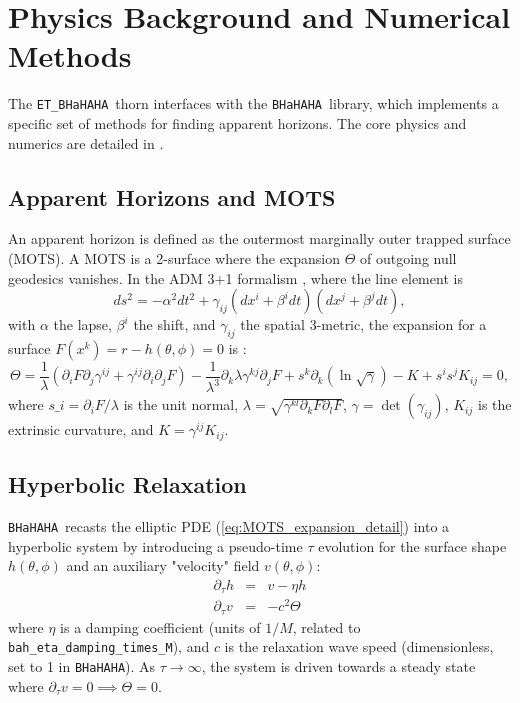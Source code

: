 \documentclass[a4paper,11pt]{article}
\newcommand{\thorn}[1]{{\tt #1}}
\newcommand{\BHaHAHA}{\thorn{ET\_BHaHAHA}} %
\newcommand{\bhahlib}{\texttt{BHaHAHA}} %
\begin{document}
\section{Physics Background and Numerical Methods}
\label{sec:physics_numerics}
The \BHaHAHA\ thorn interfaces with the \bhahlib\ library, which implements a specific set of methods for finding apparent horizons. The core physics and numerics are detailed in \cite{Etienne2025etal}.

\subsection{Apparent Horizons and MOTS}
An apparent horizon is defined as the outermost marginally outer trapped surface (MOTS). A MOTS is a 2-surface where the expansion $\Theta$ of outgoing null geodesics vanishes. In the ADM 3+1 formalism \cite{ADM62}, where the line element is
\begin{equation}
ds^2 = -\alpha^2 dt^2 + \gamma_{ij} (dx^i + \beta^i dt) (dx^j + \beta^j dt),
\label{eq:adm_line_element}
\end{equation}
with $\alpha$ the lapse, $\beta^i$ the shift, and $\gamma_{ij}$ the spatial 3-metric, the expansion for a surface $F(x^k)=r-h(\theta,\phi)=0$ is \cite{Etienne2025etal}:
\begin{equation}
\Theta = \frac{1}{\lambda} (\partial_i F \partial_j \gamma^{ij} + \gamma^{ij} \partial_i \partial_j F) - \frac{1}{\lambda^3} \partial_k \lambda \gamma^{kj} \partial_j F + s^k \partial_k (\ln \sqrt{\gamma}) - K + s^i s^j K_{ij} = 0,
\label{eq:MOTS_expansion_detail}
\end{equation}
where $s\_i = \partial_i F / \lambda$ is the unit normal, $\lambda = \sqrt{\gamma^{kl}\partial_k F \partial_l F}$, $\gamma = \det(\gamma_{ij})$, $K_{ij}$ is the extrinsic curvature, and $K = \gamma^{ij}K_{ij}$.

\subsection{Hyperbolic Relaxation}
\bhahlib\ recasts the elliptic PDE (\ref{eq:MOTS_expansion_detail}) into a hyperbolic system by introducing a pseudo-time $\tau$ evolution for the surface shape $h(\theta, \phi)$ and an auxiliary "velocity" field $v(\theta, \phi)$:
\begin{eqnarray}
\partial_\tau h &=& v - \eta h \label{eq:hr_h_detail_main} \\
\partial_\tau v &=& -c^2 \Theta \label{eq:hr_v_detail_main}
\end{eqnarray}
where $\eta$ is a damping coefficient (units of $1/M$, related to \texttt{bah\_eta\_damping\_times\_M}), and $c$ is the relaxation wave speed (dimensionless, set to 1 in \bhahlib). As $\tau \rightarrow \infty$, the system is driven towards a steady state where $\partial_\tau v = 0 \implies \Theta = 0$.
\end{document}
